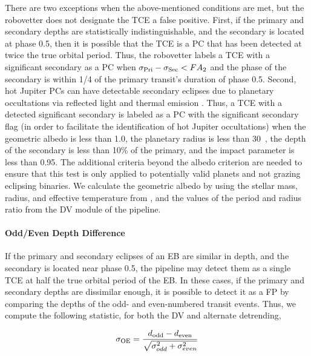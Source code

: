 There are two exceptions when the above-mentioned conditions are met, but the robovetter does not designate the TCE a false positive. First, if the primary and secondary depths are statistically indistinguishable, and the secondary is located at phase 0.5, then it is possible that the TCE is a PC that has been detected at twice the true orbital period. Thus, the robovetter labels a TCE with a significant secondary as a PC when ${\sigma_{\rm Pri} - \sigma_{\rm Sec} < FA_{2}}$ and the phase of the secondary is within 1/4 of the primary transit's duration of phase 0.5. Second, hot Jupiter PCs can have detectable secondary eclipses due to planetary occultations via reflected light and thermal emission \citep{Coughlin2012}. Thus, a TCE with a detected significant secondary is labeled as a PC with the significant secondary flag (in order to facilitate the identification of hot Jupiter occultations) when the geometric albedo is less than 1.0, the planetary radius is less than 30~\re{}, the depth of the secondary is less than 10\% of the primary, and the impact parameter is less than 0.95. The additional criteria beyond the albedo criterion are needed to ensure that this test is only applied to potentially valid planets and not grazing eclipsing binaries. We calculate the geometric albedo by using the stellar mass, radius, and effective temperature from \citet{Huber2014a}, and the values of the period and radius ratio from the DV module of the \kepler{} pipeline.



\paragraph{Odd/Even Depth Difference}
\label{s:oddeven}
If the primary and secondary eclipses of an EB are similar in depth, and the secondary is located near phase 0.5, the \kepler{} pipeline may detect them as a single TCE at half the true orbital period of the EB. In these cases, if the primary and secondary depths are dissimilar enough, it is possible to detect it as a FP by comparing the depths of the odd- and even-numbered transit events. Thus, we compute the following statistic, for both the DV and alternate detrending,

\begin{equation}
\sigma_{\rm OE} = \frac{d_{\rm odd} - d_{\rm even}}{\sqrt{\sigma_{odd}^{2} + \sigma_{even}^{2}}} 
\end{equation}


